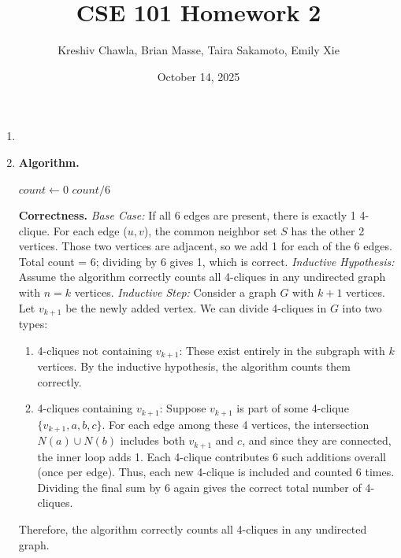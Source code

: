 \documentclass[12pt, letterpaper]{article}
\title{CSE 101 Homework 2}
\author{Kreshiv Chawla, Brian Masse, Taira Sakamoto, Emily Xie}
\date{October 14, 2025}
\begin{document}
\maketitle
\newpage

\begin{enumerate}

\item

\newpage
\item 
    \textbf{Algorithm.} \newline
    \begin{algorithm}[H]
    $count \gets 0$\;
    \Return $count / 6$\;
    \end{algorithm}
    
    \textbf{Correctness.} \medskip \newline
    \textit{Base Case:} If all 6 edges are present, there is exactly 1 4-clique. For each edge ($u,v$), the common neighbor set $S$ has the other 2 vertices. Those two vertices are adjacent, so we add 1 for each of the 6 edges. Total count = 6; dividing by 6 gives 1, which is correct. \medskip \newline
    \textit{Inductive Hypothesis:} Assume the algorithm correctly counts all 4-cliques in any undirected graph with $n=k$ vertices. \medskip \newline
    \textit{Inductive Step:} Consider a graph $G$ with $k+1$ vertices. Let $v_{k+1}$ be the newly added vertex. We can divide 4-cliques in $G$ into two types:
    \begin{enumerate}
        \item 4-cliques not containing $v_{k+1}$: These exist entirely in the subgraph with $k$ vertices. By the inductive hypothesis, the algorithm counts them correctly.
        \item 4-cliques containing $v_{k+1}$: Suppose $v_{k+1}$ is part of some 4-clique $\{v_{k+1},a,b,c\}$. For each edge among these 4 vertices, the intersection $N(a)\cup N(b)$ includes both $v_{k+1}$ and $c$, and since they are connected, the inner loop adds 1. Each 4-clique contributes 6 such additions overall (once per edge). Thus, each new 4-clique is included and counted 6 times. Dividing the final sum by 6 again gives the correct total number of 4-cliques.
    \end{enumerate}
    Therefore, the algorithm correctly counts all 4-cliques in any undirected graph.\medskip
    

\end{enumerate}
\end{document}
